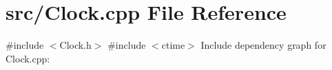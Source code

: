 \section{src/\+Clock.cpp File Reference}
\label{_clock_8cpp}
{\ttfamily \#include $<$Clock.\+h$>$}\newline
{\ttfamily \#include $<$ctime$>$}\newline
Include dependency graph for Clock.\+cpp\+:
